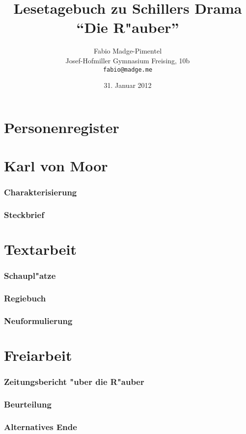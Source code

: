 \documentclass[a4paper, titlepage, draft]{article}
\author{Fabio Madge-Pimentel\\
	Josef-Hofmiller Gymnasium Freising, 10b\\
	\texttt{fabio@madge.me}}
\title{Lesetagebuch zu Schillers Drama "`Die R"auber"'}
\date{31. Januar 2012}
\begin{document}
\maketitle

\tableofcontents
\newpage

\part{Personenregister}
	
\part{Karl von Moor}
	\section{Charakterisierung}
		
	\section{Steckbrief}
		
\part{Textarbeit}
	\section{Schaupl"atze}
		
	\section{Regiebuch}
		
	\section{Neuformulierung}
		
\part{Freiarbeit}
	\section{Zeitungsbericht "uber die R"auber}
		
	\section{Beurteilung}
		
	\section{Alternatives Ende}
		
\end{document}
